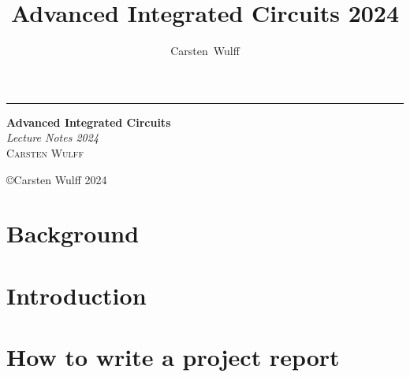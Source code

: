 \documentclass[11pt,twoside,openright]{kaobook}
\title{Advanced Integrated Circuits 2024}
\author{Carsten~Wulff}
\date{}
\begin{document}
\begin{titlepage} %

	\raggedleft %

	\rule{1pt}{\textheight} %
	\hspace{0.05\textwidth} %
	\parbox[b]{0.75\textwidth}{ %

		{\Huge\bfseries Advanced Integrated Circuits}\\[2\baselineskip] %
		{\large\textit{Lecture Notes 2024}}\\[4\baselineskip] %
		{\Large\textsc{Carsten Wulff}} %

		\vspace{0.5\textheight} %

    

		{\noindent \copyright Carsten Wulff 2024}\\[\baselineskip] %
	}

\end{titlepage}



{
\hypersetup{linkcolor=}
\setcounter{tocdepth}{2}
\tableofcontents
}



\mainmatter

\chapter{Background}



\setchapterpreamble[u]{\margintoc}
\chapter{Introduction}


\setchapterpreamble[u]{\margintoc}
\chapter{How to write a project report}

\end{document}
